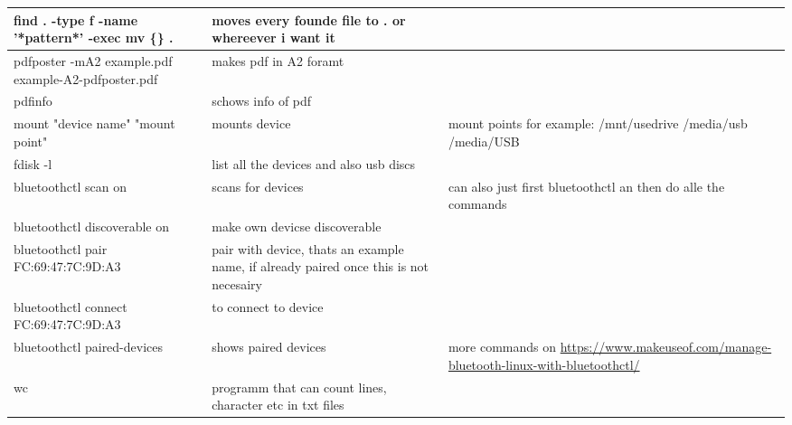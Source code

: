 \documentclass[12pt]{article}
\begin{document}
\begin{tabular}{| p{6.5cm} | p{6.5cm} | p{6.5cm} |}
    \hline
    find . -type f -name '*pattern*' -exec mv \{\} . \; & moves every founde file to . or whereever i want it &\\
    \hline 
    pdfposter -mA2 example.pdf example-A2-pdfposter.pdf & makes pdf in A2 foramt &\\
    \hline
    pdfinfo & schows info of pdf & \\
    \hline
    mount "device name" "mount point" & mounts device & mount points for example: /mnt/usedrive /media/usb /media/USB \\
    \hline
    fdisk -l & list all the devices and also usb discs & \\
    \hline 
    bluetoothctl scan on & scans for devices & can also just first bluetoothctl an then do alle the commands \\
    \hline 
    bluetoothctl discoverable on & make own devicse discoverable & \\
    \hline 
    bluetoothctl pair FC:69:47:7C:9D:A3 & pair with device, thats an example name, if already paired once this is not necesairy & \\
    \hline 
    bluetoothctl connect FC:69:47:7C:9D:A3 & to connect to device & \\
    \hline
    bluetoothctl paired-devices & shows paired devices &  more commands on \url{https://www.makeuseof.com/manage-bluetooth-linux-with-bluetoothctl/}\\
    \hline 
    wc & programm that can count lines, character etc in txt files & \\
    \hline 
\end{tabular}


\newpage
\end{document}
